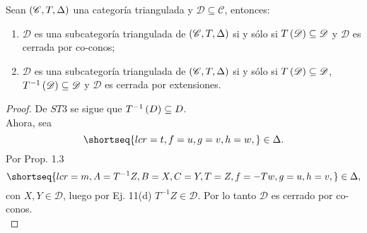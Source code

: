 \documentclass{article}
\begin{document}
	\begin{propsn}[Lema 1.12]
		Sean $\left(\mathscr{C},T,\Delta\right)$ una categoría triangulada y $\mathscr{D}\subseteq\mathscr{C}$, entonces:
		\begin{enumerate}[label=(\roman*)]
			\item $\mathscr{D}$ es una subcategoría triangulada de $\left(\mathscr{C},T,\Delta\right)$ si y sólo si $T\left(\mathscr{D}\right)\subseteq\mathscr{D}$ y $\mathscr{D}$ es cerrada por co-conos;
			\item $\mathscr{D}$ es una subcategoría triangulada de $\left(\mathscr{C},T,\Delta\right)$ si y sólo si $T\left(\mathscr{D}\right)\subseteq\mathscr{D}$, $T^{-1}\left(\mathscr{D}\right)\subseteq\mathscr{D}$ y $\mathscr{D}$ es cerrada por extensiones.
		\end{enumerate}
		\begin{proof}
			 De $ST3$ se sigue que $T^{-1}\left(D\right)\subseteq{D}$.\\
			Ahora, sea
			\begin{equation*}
				\shortseq{lcr=t,f=u,g=v,h=w,}\in\Delta.
			\end{equation*}
			Por Prop. 1.3 
			\begin{equation*}
				\shortseq{lcr=m,A=T^{-1}Z,B=X,C=Y,T=Z,f=-Tw,g=u,h=v,}\in\Delta,
			\end{equation*}
			con $X,Y\in \mathscr{D}$, luego por Ej. 11(d) $T^{-1}Z\in\mathscr{D}$. Por lo tanto $\mathscr{D}$ es cerrado por co-conos.\\
			

\end{proof}
\end{propsn}
\end{document}
